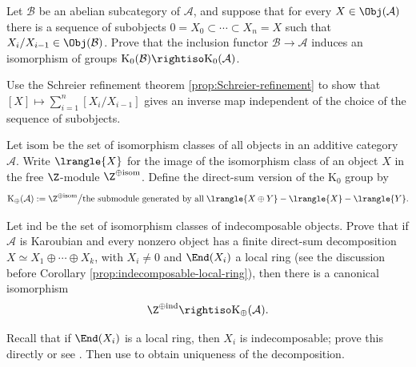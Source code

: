\begin{Exercises}
	\item Let $\mathcal{B}$ be an abelian subcategory of $\mathcal{A}$, and
	suppose that for every $X\in\Obj(\mathcal{A})$ there is a sequence of
	subobjects $0=X_0\subset\cdots\subset X_n=X$ such that
	$X_i/X_{i-1}\in\Obj(\mathcal{B})$. Prove that the inclusion functor
	$\mathcal{B}\to\mathcal{A}$ induces an isomorphism of groups
	$\mathrm{K}_0(\mathcal{B})\rightiso\mathrm{K}_0(\mathcal{A})$.

	\begin{hint}
		Use the Schreier refinement theorem
		\ref{prop:Schreier-refinement} to show that
		$[X]\mapsto\sum_{i=1}^n[X_i/X_{i-1}]$ gives an inverse map independent
		of the choice of the sequence of subobjects.
	\end{hint}

	\item Let $\mathrm{isom}$ be the set of isomorphism classes of all objects
	in an additive category $\mathcal{A}$. Write $\lrangle{X}$ for the image of
	the isomorphism class of an object $X$ in the free $\Z$-module
	$\Z^{\oplus\mathrm{isom}}$. Define the direct-sum version of the
	$\mathrm{K}_0$ group by
	\[ \mathrm{K}_{\oplus}(\mathcal{A}) := \Z^{\oplus \mathrm{isom}} \big/
	\text{the submodule generated by all}\;
	\lrangle{X \oplus Y} - \lrangle{X} - \lrangle{Y}. \]

	Let $\mathrm{ind}$ be the set of isomorphism classes of indecomposable
	objects. Prove that if $\mathcal{A}$ is Karoubian and every nonzero object
	has a finite direct-sum decomposition
	$X\simeq X_1\oplus\cdots\oplus X_k$, with $X_i\neq0$ and
	$\End(X_i)$ a local ring (see the discussion before Corollary
	\ref{prop:indecomposable-local-ring}), then there is a canonical
	isomorphism
	\[ \Z^{\oplus \mathrm{ind}} \rightiso \mathrm{K}_{\oplus}(\mathcal{A}). \]

	\begin{hint}
		Recall that if $\End(X_i)$ is a local ring, then $X_i$ is
		indecomposable; prove this directly or see \cite[Lemma 6.12.6]{Li1}.
		Then use \cite[Theorem 6.12.8]{Li1} to obtain uniqueness of the
		decomposition.
	\end{hint}


\end{Exercises}
